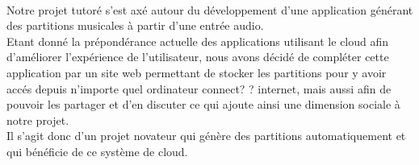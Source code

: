 \paragraph{}
Notre projet tutoré s'est axé autour du développement d'une application générant des partitions musicales à partir d'une entrée audio. \\
Etant donné la prépondérance actuelle des applications utilisant le cloud afin d'améliorer l'expérience de l'utilisateur, nous avons décidé de compléter cette application par un site web permettant de stocker les partitions pour y avoir accés depuis n'importe quel ordinateur connect? ? internet, mais aussi afin de pouvoir les partager et d'en discuter ce qui ajoute ainsi une dimension sociale à notre projet. \\
Il s'agit donc d'un projet novateur qui génère des partitions automatiquement et qui bénéficie de ce  système de cloud.
